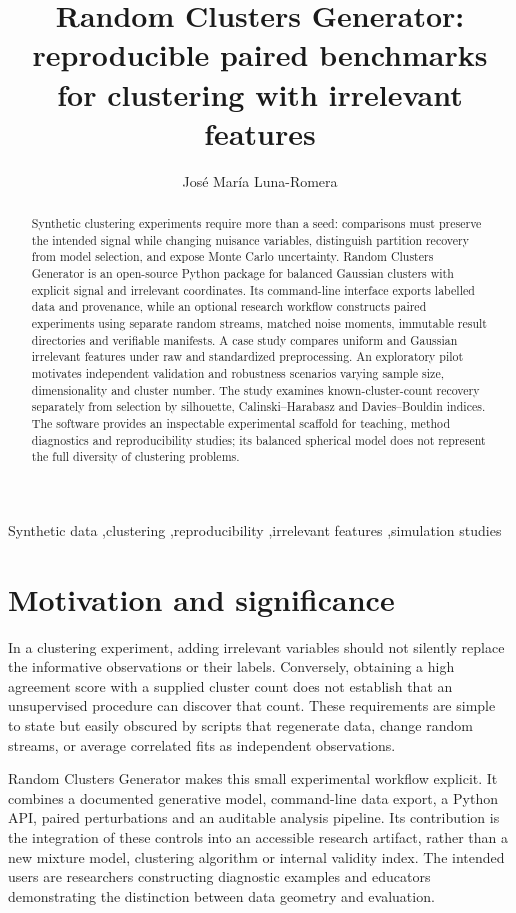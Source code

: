 \documentclass[preprint,12pt]{elsarticle}
\begin{document}
\begin{frontmatter}
\title{Random Clusters Generator: reproducible paired benchmarks for clustering with irrelevant features}
\author{Jos\'e Mar\'ia Luna-Romera}
\begin{abstract}
Synthetic clustering experiments require more than a seed: comparisons must
preserve the intended signal while changing nuisance variables, distinguish
partition recovery from model selection, and expose Monte Carlo uncertainty.
Random Clusters Generator is an open-source Python package for balanced Gaussian
clusters with explicit signal and irrelevant coordinates. Its command-line
interface exports labelled data and provenance, while an optional research
workflow constructs paired experiments using separate random streams, matched
noise moments, immutable result directories and verifiable manifests. A case
study compares uniform and Gaussian irrelevant features under raw and
standardized preprocessing. An exploratory pilot motivates independent
validation and robustness scenarios varying sample size, dimensionality and
cluster number. The study examines known-cluster-count recovery separately from
selection by silhouette, Calinski--Harabasz and Davies--Bouldin indices. The
software provides an inspectable experimental scaffold for teaching, method
diagnostics and reproducibility studies; its balanced spherical model does not
represent the full diversity of clustering problems.
\end{abstract}
\begin{keyword}
Synthetic data \sep clustering \sep reproducibility \sep irrelevant features \sep simulation studies
\end{keyword}
\end{frontmatter}

\section{Motivation and significance}
In a clustering experiment, adding irrelevant variables should not silently
replace the informative observations or their labels. Conversely, obtaining a
high agreement score with a supplied cluster count does not establish that an
unsupervised procedure can discover that count. These requirements are simple
to state but easily obscured by scripts that regenerate data, change random
streams, or average correlated fits as independent observations.

Random Clusters Generator makes this small experimental workflow explicit. It
combines a documented generative model, command-line data export, a Python API,
paired perturbations and an auditable analysis pipeline. Its contribution is
the integration of these controls into an accessible research artifact, rather
than a new mixture model, clustering algorithm or internal validity index.
The intended users are researchers constructing diagnostic examples and
educators demonstrating the distinction between data geometry and evaluation.
\end{document}
